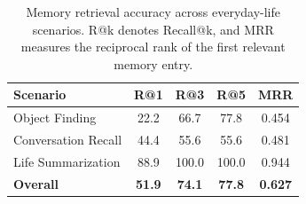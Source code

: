 \begin{table}[H]
\centering
\small
\setlength{\tabcolsep}{3pt}
\renewcommand{\arraystretch}{1.10}
\begin{tabular*}{\columnwidth}{@{\extracolsep{\fill}}lcccc@{}}
\toprule
\textbf{Scenario} & 
\textbf{R@1} & 
\textbf{R@3} & 
\textbf{R@5} & 
\textbf{MRR} \\
\midrule
Object Finding       & 22.2 & 66.7 & 77.8 & 0.454 \\
Conversation Recall  & 44.4 & 55.6 & 55.6 & 0.481 \\
Life Summarization   & 88.9 & 100.0 & 100.0 & 0.944 \\
\midrule
\textbf{Overall}     & \textbf{51.9} & \textbf{74.1} & \textbf{77.8} & \textbf{0.627} \\
\bottomrule
\end{tabular*}
\caption{
Memory retrieval accuracy across everyday-life scenarios.
R@k denotes Recall@k, and MRR measures the reciprocal rank of the first relevant memory entry.
}
\label{tab:retrieval_accuracy}
\vspace{-3mm}
\end{table}